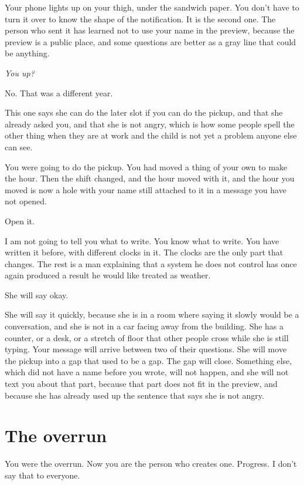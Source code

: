 \documentclass[11pt,oneside]{book}
\begin{document}
Your phone lights up on your thigh, under the sandwich paper. You don't have to turn it over to know the shape of the notification. It is the second one. The person who sent it has learned not to use your name in the preview, because the preview is a public place, and some questions are better as a gray line that could be anything.

\emph{You up?}

No. That was a different year.

This one says she can do the later slot if you can do the pickup, and that she already asked you, and that she is not angry, which is how some people spell the other thing when they are at work and the child is not yet a problem anyone else can see.

You were going to do the pickup. You had moved a thing of your own to make the hour. Then the shift changed, and the hour moved with it, and the hour you moved is now a hole with your name still attached to it in a message you have not opened.

Open it.

I am not going to tell you what to write. You know what to write. You have written it before, with different clocks in it. The clocks are the only part that changes. The rest is a man explaining that a system he does not control has once again produced a result he would like treated as weather.

She will say okay.

She will say it quickly, because she is in a room where saying it slowly would be a conversation, and she is not in a car facing away from the building. She has a counter, or a desk, or a stretch of floor that other people cross while she is still typing. Your message will arrive between two of their questions. She will move the pickup into a gap that used to be a gap. The gap will close. Something else, which did not have a name before you wrote, will not happen, and she will not text you about that part, because that part does not fit in the preview, and because she has already used up the sentence that says she is not angry.

\section*{The overrun}

You were the overrun. Now you are the person who creates one. Progress. I don't say that to everyone.
\end{document}
